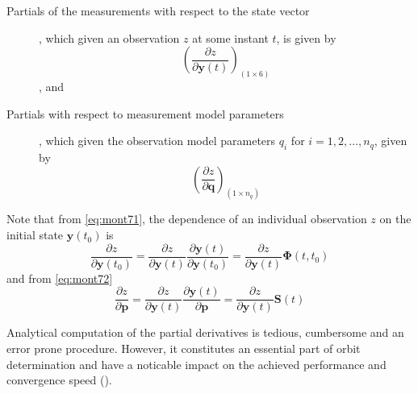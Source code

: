\begin{description}
  \item[Partials of the measurements with respect to the state vector], which given 
    an observation $z$  at some instant $t$, is given by
    \begin{equation}\label{eq:mont73}
      \left( \frac{\partial z}{\partial \bm{y}(t)} \right) _{(1 \times 6)}
    \end{equation}, and

  \item[Partials with respect to measurement model parameters], which given the observation 
    model parameters $q_i$ for $i=1,2, \dots ,n_q$, given by 
    \begin{equation}\label{eq:mont74}
       \left( \frac{\partial z}{\partial \bm{q}} \right) _{(1 \times n_q)}
    \end{equation}

\end{description}

Note that from \autoref{eq:mont71}, the dependence of an individual observation $z$ 
on the initial state $\bm{y}(t_0)$ is
\begin{equation}
  \frac{\partial z}{\partial \bm{y}(t_0)} = 
    \frac{\partial z}{\partial \bm{y}(t)}\frac{\partial \bm{y}(t)}{\partial \bm{y}(t_0)} 
    = \frac{\partial z}{\partial \bm{y}(t)} \bm{\Phi} (t,t_0)
\end{equation}
and from \autoref{eq:mont72}
\begin{equation}
  \frac{\partial z}{\partial \bm{p}} = 
    \frac{\partial z}{\partial \bm{y}(t)}\frac{\partial \bm{y}(t)}{\partial \bm{p}}
    = \frac{\partial z}{\partial \bm{y}(t)} \bm{S} (t)
\end{equation}

Analytical computation of the partial derivatives is tedious, cumbersome and an 
error prone procedure. However, it constitutes an essential part of orbit determination 
and have a noticable impact on the achieved performance and convergence speed 
(\cite{Montenbruck2000}).

